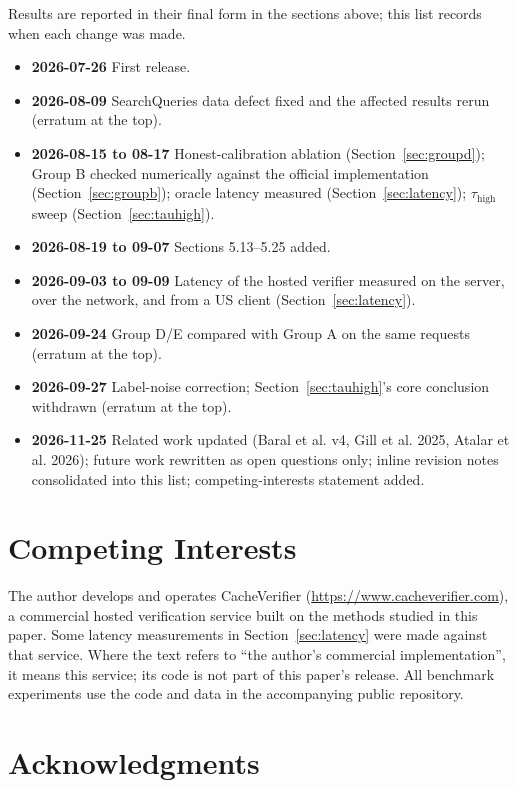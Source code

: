\documentclass[11pt]{article}
\begin{document}
Results are reported in their final form in the sections above; this list records when each change was made.

\begin{itemize}[leftmargin=*]
  \item \textbf{2026-07-26} First release.
  \item \textbf{2026-08-09} SearchQueries data defect fixed and the affected results rerun (erratum at the top).
  \item \textbf{2026-08-15 to 08-17} Honest-calibration ablation (Section~\ref{sec:groupd}); Group B checked numerically against the official implementation (Section~\ref{sec:groupb}); oracle latency measured (Section~\ref{sec:latency}); $\tau_{\text{high}}$ sweep (Section~\ref{sec:tauhigh}).
  \item \textbf{2026-08-19 to 09-07} Sections 5.13--5.25 added.
  \item \textbf{2026-09-03 to 09-09} Latency of the hosted verifier measured on the server, over the network, and from a US client (Section~\ref{sec:latency}).
  \item \textbf{2026-09-24} Group D/E compared with Group A on the same requests (erratum at the top).
  \item \textbf{2026-09-27} Label-noise correction; Section~\ref{sec:tauhigh}'s core conclusion withdrawn (erratum at the top).
  \item \textbf{2026-11-25} Related work updated (Baral et al. v4, Gill et al. 2025, Atalar et al. 2026); future work rewritten as open questions only; inline revision notes consolidated into this list; competing-interests statement added.
\end{itemize}

\section*{Competing Interests}

The author develops and operates CacheVerifier (\url{https://www.cacheverifier.com}), a commercial hosted verification service built on the methods studied in this paper. Some latency measurements in Section~\ref{sec:latency} were made against that service. Where the text refers to ``the author's commercial implementation'', it means this service; its code is not part of this paper's release. All benchmark experiments use the code and data in the accompanying public repository.

\section*{Acknowledgments}
\end{document}
